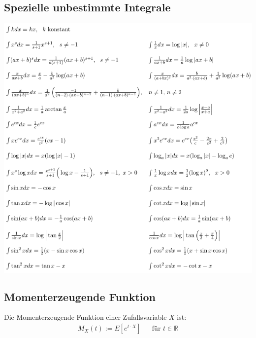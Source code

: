 \documentclass[8pt]{extarticle}
\newcommand{\R}{\mathbb{R}}
\begin{document}
\begin{multicols*}{3}
  \subsection*{Spezielle unbestimmte Integrale}
  \includegraphics[scale=0.45]{integrale.png}
  \subsection*{Momenterzeugende Funktion}
  Die Momenterzeugende Funktion einer Zufallsvariable $X$ ist:
  \begin{align*}
    M_X(t) := E[e^{t \cdot X}] &  & \text{für } t \in \R
  \end{align*}

\end{multicols*}
\end{document}
